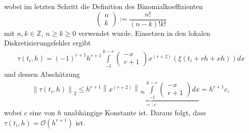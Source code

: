 wobei im letzten Schritt die Definition des Binomialkoeffizienten
\[
    \begin{pmatrix} n \\ k  \end{pmatrix} := \frac{n!}{(n-k)!k!}
\]
mit $n,k \in \mathbb{Z}$, $n\geq k \geq 0$ verwendet wurde. Einsetzen in den lokalen Diskretisierungsfehler ergibt
\begin{align*}
    \tau(t_i,h) = (-1)^{r+1} h^{r+1} \int\limits_{-l}^{k-r} \begin{pmatrix} -x \\ r+1 \end{pmatrix}
    x^{(r+2)}(\xi(t_i+rh+xh))dx
\end{align*}
und dessen Abschätzung
\begin{align*}
    \left\lVert \tau(t_i,h) \right\rVert_2 \leq h^{r+1}
    \underbrace{
        \left\lVert x^{(r+2)}\right\rVert_{\infty}\int\limits_{-l}^{k-r} \begin{pmatrix} -x \\ r+1 \end{pmatrix} dx
    }_{=:c} = h^{r+1}c,
\end{align*}
wobei $c$ eine von $h$ unabhängige Konstante ist. Daraus folgt, dass $\tau(t_i, h)=\mathcal{O}(h^{r+1})$ ist. \qedwhite

